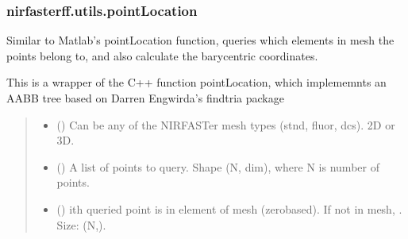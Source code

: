 \documentclass[letterpaper,10pt,english]{sphinxmanual}
\begin{document}
\sphinxstepscope


\subsubsection{nirfasterff.utils.pointLocation}
\label{\detokenize{_autosummary/nirfasterff.utils.pointLocation:nirfasterff-utils-pointlocation}}\label{\detokenize{_autosummary/nirfasterff.utils.pointLocation::doc}}

\begin{fulllineitems}
\label{\detokenize{_autosummary/nirfasterff.utils.pointLocation:nirfasterff.utils.pointLocation}}
\pysigstartsignatures
\pysiglinewithargsret
{}
{\sphinxparamcomma {}}
{}
\pysigstopsignatures
\sphinxAtStartPar
Similar to Matlab’s pointLocation function, queries which elements in mesh the points belong to, and also calculate the barycentric coordinates.

\sphinxAtStartPar
This is a wrapper of the C++ function pointLocation, which implememnts an AABB tree based on Darren Engwirda’s findtria package
\begin{quote}\begin{description}
\begin{itemize}
\item {} 
\sphinxAtStartPar
{} () \textendash{} Can be any of the NIRFASTer mesh types (stnd, fluor, dcs). 2D or 3D.

\item {} 
\sphinxAtStartPar
{} () \textendash{} A list of points to query. Shape (N, dim), where N is number of points.

\end{itemize}

\sphinxAtStartPar
\begin{itemize}
\item {} 
\sphinxAtStartPar
{} () \textendash{} i\sphinxhyphen{}th queried point is in element  of mesh (zero\sphinxhyphen{}based). If not in mesh, . Size: (N,).


\end{itemize}
\end{description}
\end{quote}
\end{fulllineitems}
\end{document}
